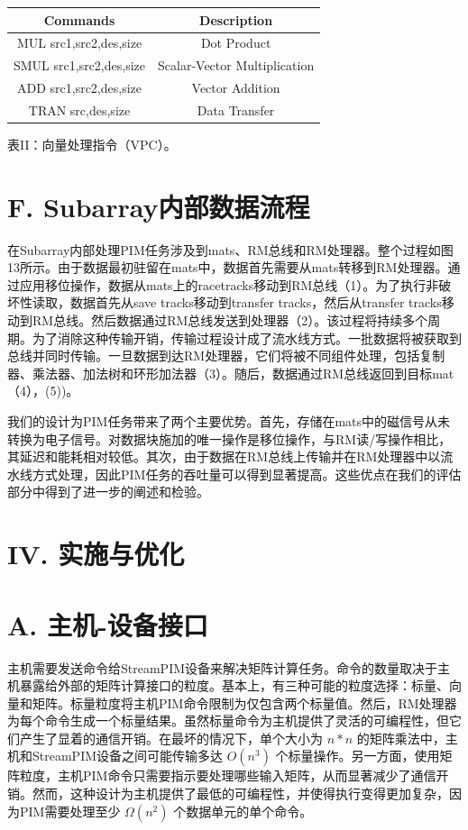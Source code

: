 \documentclass[10pt]{article}
\begin{document}
\begin{center}
\begin{tabular}{|c|c|}
\hline
Commands & Description \\
\hline
MUL src1,src2,des,size & Dot Product \\
\hline
SMUL src1,src2,des,size & Scalar-Vector Multiplication \\
\hline
ADD src1,src2,des,size & Vector Addition \\
\hline
TRAN src,des,size & Data Transfer \\
\hline
\end{tabular}
\end{center}

表II：向量处理指令（VPC）。

\section*{F. Subarray内部数据流程}
在Subarray内部处理PIM任务涉及到mats、RM总线和RM处理器。整个过程如图13所示。由于数据最初驻留在mats中，数据首先需要从mats转移到RM处理器。通过应用移位操作，数据从mats上的racetracks移动到RM总线（1）。为了执行非破坏性读取，数据首先从save tracks移动到transfer tracks，然后从transfer tracks移动到RM总线。然后数据通过RM总线发送到处理器（2）。该过程将持续多个周期。为了消除这种传输开销，传输过程设计成了流水线方式。一批数据将被获取到总线并同时传输。一旦数据到达RM处理器，它们将被不同组件处理，包括复制器、乘法器、加法树和环形加法器（3）。随后，数据通过RM总线返回到目标mat（4），(5))。

我们的设计为PIM任务带来了两个主要优势。首先，存储在mats中的磁信号从未转换为电子信号。对数据块施加的唯一操作是移位操作，与RM读/写操作相比，其延迟和能耗相对较低。其次，由于数据在RM总线上传输并在RM处理器中以流水线方式处理，因此PIM任务的吞吐量可以得到显著提高。这些优点在我们的评估部分中得到了进一步的阐述和检验。

\section*{IV. 实施与优化}
\section*{A. 主机-设备接口}
主机需要发送命令给StreamPIM设备来解决矩阵计算任务。命令的数量取决于主机暴露给外部的矩阵计算接口的粒度。基本上，有三种可能的粒度选择：标量、向量和矩阵。标量粒度将主机PIM命令限制为仅包含两个标量值。然后，RM处理器为每个命令生成一个标量结果。虽然标量命令为主机提供了灵活的可编程性，但它们产生了显着的通信开销。在最坏的情况下，单个大小为 $n * n$ 的矩阵乘法中，主机和StreamPIM设备之间可能传输多达 $O\left(n^{3}\right)$ 个标量操作。另一方面，使用矩阵粒度，主机PIM命令只需要指示要处理哪些输入矩阵，从而显著减少了通信开销。然而，这种设计为主机提供了最低的可编程性，并使得执行变得更加复杂，因为PIM需要处理至少 $\Omega\left(n^{2}\right)$ 个数据单元的单个命令。
\end{document}
